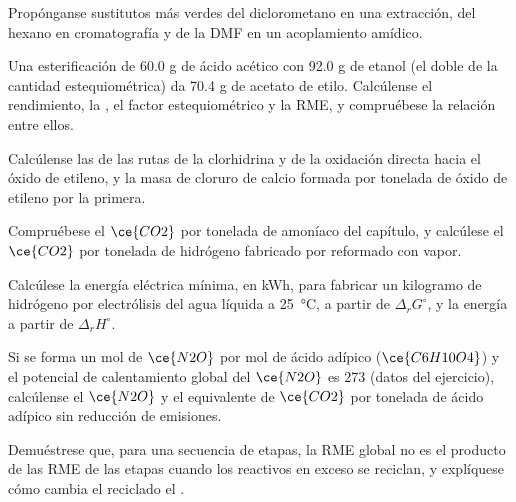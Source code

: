 \begin{exercise}[$\star$]\label{exo:b3:green-industrial:4}
Propónganse sustitutos más verdes del diclorometano en una extracción, del hexano en
cromatografía y de la DMF en un acoplamiento amídico.
\end{exercise}

\begin{exercise}[$\star\star$]\label{exo:b3:green-industrial:5}
Una esterificación de 60.0 g de ácido acético con 92.0 g de etanol (el doble de la
cantidad estequiométrica) da 70.4 g de acetato de etilo. Calcúlense el rendimiento, la , el factor estequiométrico y la RME, y compruébese la relación entre
ellos.
\end{exercise}

\begin{exercise}[$\star\star$]\label{exo:b3:green-industrial:6}
Calcúlense las  de las rutas de la clorhidrina y de la oxidación directa hacia el
óxido de etileno, y la masa de cloruro de calcio formada por tonelada de óxido de etileno
por la primera.
\end{exercise}

\begin{exercise}[$\star\star$]\label{exo:b3:green-industrial:7}
Compruébese el $\ce{CO2}$ por tonelada de amoníaco del capítulo, y calcúlese el $\ce{CO2}$ por tonelada de
hidrógeno fabricado por reformado con vapor.
\end{exercise}

\begin{exercise}[$\star\star$]\label{exo:b3:green-industrial:8}
Calcúlese la energía eléctrica mínima, en kWh, para fabricar un kilogramo de hidrógeno por
electrólisis del agua líquida a \qty{25}{\celsius}, a partir de $\Delta_rG^\circ$, y la energía a partir de $\Delta_rH^\circ$.
\end{exercise}

\begin{exercise}[$\star\star$]\label{exo:b3:green-industrial:9}
Si se forma un mol de $\ce{N2O}$ por mol de ácido adípico ($\ce{C6H10O4}$) y el potencial de calentamiento
global del $\ce{N2O}$ es 273 (datos del ejercicio), calcúlense el $\ce{N2O}$ y el equivalente de $\ce{CO2}$
por tonelada de ácido adípico sin reducción de emisiones.
\end{exercise}

\begin{exercise}[$\star\star\star$]\label{exo:b3:green-industrial:10}
Demuéstrese que, para una secuencia de etapas, la RME global no es el producto de las RME de
las etapas cuando los reactivos en exceso se reciclan, y explíquese cómo cambia el reciclado el
.
\end{exercise}

